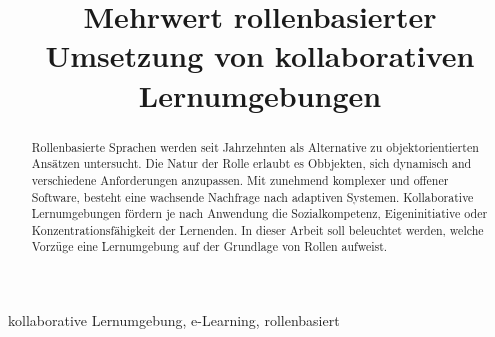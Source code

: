 \documentclass[conference]{IEEEtran}
\begin{document}
\title{Mehrwert rollenbasierter Umsetzung von kollaborativen Lernumgebungen\\}


\author{
}



\maketitle

\begin{abstract} Rollenbasierte Sprachen werden seit Jahrzehnten als Alternative zu objektorientierten Ansätzen untersucht. Die Natur der Rolle erlaubt es Obbjekten, sich dynamisch and verschiedene Anforderungen anzupassen. Mit zunehmend komplexer und offener Software, besteht eine wachsende Nachfrage nach adaptiven Systemen. Kollaborative Lernumgebungen fördern je nach Anwendung die Sozialkompetenz, Eigeninitiative oder Konzentrationsfähigkeit der Lernenden. In dieser Arbeit soll beleuchtet werden, welche Vorzüge eine Lernumgebung auf der Grundlage von Rollen aufweist.
\end{abstract}

\begin{IEEEkeywords}
kollaborative Lernumgebung, e-Learning, rollenbasiert
\end{IEEEkeywords}
\end{document}
